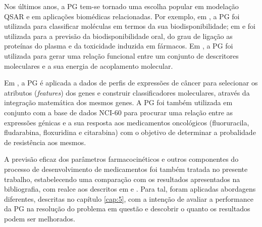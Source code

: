 Nos últimos anos, a \ac{PG} tem-se tornado uma escolha popular em modelação \ac{QSAR} e em aplicações biomédicas relacionadas. Por exemplo,
em \citep{langdon2005genetic}, a \ac{PG} foi utilizada para classificar moléculas em termos da sua biodisponibilidade; 
em \citep{Archetti2007,vanneschi2009using,vanneschi2010measuring} e \citep{castelli2011quantitative} foi utilizada para 
a previsão da biodisponibilidade oral, 
do grau de ligação as proteínas do plasma e da toxicidade induzida em fármacos. Em \citep{archetti2010genetic}, a \ac{PG} foi utilizada para gerar uma relação funcional
entre um conjunto de descritores moleculares e a sua energia de acoplamento molecular.

Em \citep{yu2007feature}, a \ac{PG} é aplicada a dados de perfis de expressões de câncer para selecionar os atributos (\emph{features}) dos genes
e construir classificadores moleculares, através da integração matemática dos mesmos genes. A \ac{PG} foi também utilizada em conjunto com
a base de dados NCI-60 para procurar uma relação entre as expressões génicas e a sua resposta aos medicamentos oncológicos (fluoruracila, 
fludarabina, floxuridina e citarabina) com o objetivo de determinar a probalidade de resistência aos mesmos.


A previsão eficaz dos parâmetros farmacocinéticos e outros componentes do processo de desenvolvimento de medicamentos foi também tratada
no presente trabalho, estabelecendo uma comparação com os resultados apresentados na bibliografia, com realce aos descritos em 
\citep{Archetti2007,vanneschi2009using,vanneschi2010measuring,castelli2011quantitative,archetti2010genetic}
e \citep{archetti2010genetic}.
Para tal, foram aplicadas abordagens diferentes, descritas no capítulo \ref{cap:5}, com a intenção de avaliar a performance da \ac{PG}
na resolução do problema em questão e descobrir o quanto os resultados podem ser melhorados.